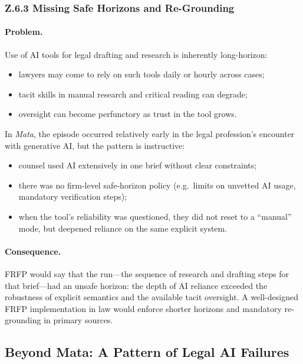 \subsubsection*{Z.6.3 Missing Safe Horizons and Re-Grounding}

\paragraph{Problem.}
Use of AI tools for legal drafting and research is inherently long-horizon:

\begin{itemize}
  \item lawyers may come to rely on such tools daily or hourly across cases;
  \item tacit skills in manual research and critical reading can degrade;
  \item oversight can become perfunctory as trust in the tool grows.
\end{itemize}

In \emph{Mata}, the episode occurred relatively early in the legal
profession’s encounter with generative AI, but the pattern is instructive:

\begin{itemize}
  \item counsel used AI extensively in one brief without clear constraints;
  \item there was no firm-level safe-horizon policy (e.g.\ limits on unvetted
        AI usage, mandatory verification steps);
  \item when the tool’s reliability was questioned, they did not reset to
        a ``manual'' mode, but deepened reliance on the same explicit system.
\end{itemize}

\paragraph{Consequence.}
FRFP would say that the run---the sequence of research and drafting steps
for that brief---had an unsafe horizon:
the depth of AI reliance exceeded the robustness of explicit semantics and
the available tacit oversight.
A well-designed FRFP implementation in law would enforce shorter horizons
and mandatory re-grounding in primary sources.

\subsection{Beyond Mata: A Pattern of Legal AI Failures}

